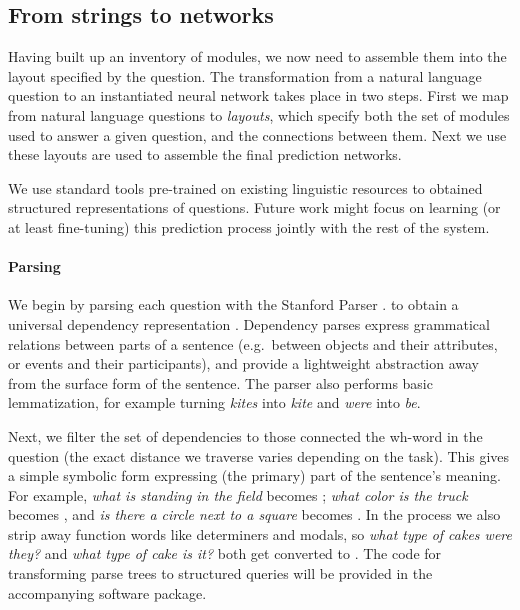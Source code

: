 \subsection{From strings to networks}

Having built up an inventory of modules, we now need to assemble them into the
layout specified by the question.
The transformation from a natural language question to an instantiated neural
network takes place in two steps.  First we map from natural language questions
to \emph{layouts}, which specify both the set of modules used to answer a given
question, and the connections between them. Next we use these layouts are used
to assemble the final prediction networks.

We use standard tools pre-trained on existing linguistic resources to obtained
structured representations of questions. Future work might focus on learning (or
at least fine-tuning) this prediction process jointly with the rest of the
system. %

\paragraph{Parsing}
We begin by parsing each question with the Stanford Parser
\cite{Klein03Unlex}.
to obtain a universal dependency representation \cite{DeMarneffe08Deps}.
Dependency parses express grammatical relations between parts of a sentence
(e.g.\ between objects and their attributes, or events and their participants),
and provide a lightweight abstraction away from the surface form of the
sentence. The parser also performs basic lemmatization, for example turning
\emph{kites} into \emph{kite} and \emph{were} into \emph{be}. 

Next, we filter the set of dependencies to those connected the wh-word in the
question (the exact distance we traverse varies depending on the task). This
gives a simple symbolic form expressing (the primary) part of the sentence's
meaning.  For example, \emph{what is standing in the field} becomes
; \emph{what color is the truck} becomes ,
and \emph{is there a circle next to a square} becomes .
In the process we also strip away function words like determiners and
modals, so \emph{what type of cakes were they?} and \emph{what type of cake is
it?} both get converted to .
The code for transforming parse trees to structured queries
will be provided in the accompanying software package.

